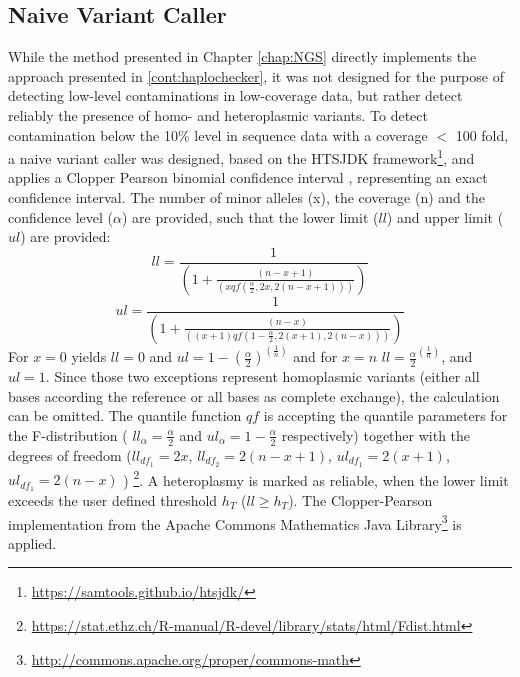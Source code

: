 \subsection{Naive Variant Caller}
While the method presented in Chapter \ref{chap:NGS} directly implements the approach presented in \ref{cont:haplochecker}, it was not designed for the purpose of detecting low-level contaminations in low-coverage data, but rather detect reliably the presence of homo- and heteroplasmic variants. To detect contamination below the 10\% level in sequence data with a coverage $<$ 100 fold, a naive variant caller was designed, based on the HTSJDK framework\footnote{\url{https://samtools.github.io/htsjdk/}}, and applies a Clopper Pearson binomial confidence interval \cite{CLOPPER1934}, representing an exact confidence interval. The number of minor alleles (x), the coverage (n) and the confidence level ($\alpha$) are provided, such that the lower limit ($ll$) and upper limit ($ul$) are provided:
\begin{equation}
 ll = \frac{1}{(1 + \frac{(n - x + 1)}{(x qf(\frac{\alpha}{2}, 2 x, 2 (n-x+1)))})}
\end{equation}
\begin{equation}
 ul = \frac{1}{(1 + \frac{(n - x)    }{ ((x + 1)  qf(1-\frac{\alpha}{2}, 2 (x+1), 2 (n-x)))})}
\end{equation}
For $x=0$ yields $ll=0$ and $ul = 1 - (\frac{\alpha}{2})^{(\frac{1}{n})}$ and for $x = n$ $ll = \frac{\alpha}{2}^{(\frac{1}{n})}$, and $ul =1$. Since those two exceptions represent homoplasmic variants (either all bases according the reference or all bases as complete exchange), the calculation can be omitted.
The quantile function $qf$ is accepting the quantile parameters for the F-distribution ( $ll_{\alpha} = \frac{\alpha}{2}$ and $ul_{\alpha}= 1-\frac{\alpha}{2}$ respectively) together with the degrees of freedom ($ll_{df_1} = 2x$, $ll_{df_2} = 2 (n-x+1)$,  $ul_{df_1} =  2 (x+1)$, $ul_{df_1} =  2 (n-x)$ ) \footnote{\url{https://stat.ethz.ch/R-manual/R-devel/library/stats/html/Fdist.html}}. A heteroplasmy is marked as reliable, when the lower limit exceeds the user defined threshold $h_T$ ($ll  \geq h_T$). The Clopper-Pearson implementation from the Apache Commons Mathematics Java Library\footnote{\url{http://commons.apache.org/proper/commons-math}} is applied.

